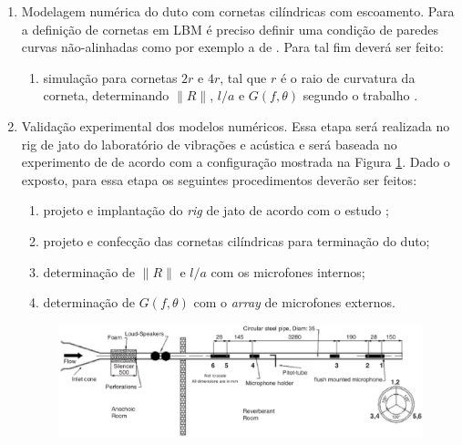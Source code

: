 \begin{enumerate}
    \item Modelagem numérica do duto com cornetas cilíndricas com escoamento. Para a definição de cornetas em LBM é preciso definir uma condição de paredes curvas não-alinhadas como por exemplo a de . Para tal fim deverá ser feito:
        \begin{enumerate}
            \item simulação para cornetas $2r$ e $4r$, tal que $r$ é o raio de curvatura da corneta, determinando $\|R\|$, $l/a$ e $G(f,\theta)$ segundo o trabalho \cite{da2009sound}.
        \end{enumerate}
    
    \item Validação experimental dos modelos numéricos. Essa etapa será realizada no rig de jato do laboratório de vibrações e acústica e será baseada no experimento de  de acordo com a configuração mostrada na Figura \ref{fig:duto_abom}. Dado o exposto, para essa etapa os seguintes procedimentos deverão ser feitos:
    \begin{enumerate}
            \item projeto e implantação do \textit{rig} de jato de acordo com o estudo \cite{allam2006investigation};
            \item projeto e confecção das cornetas cilíndricas para terminação do duto;
            \item determinação de $\|R\|$ e $l/a$ com os microfones internos; 
            \item determinação de $G(f,\theta)$ com o \textit{array} de microfones externos. 
        \end{enumerate}
    \begin{figure}[ht!]
    \centering
      \includegraphics[width=.95\linewidth]{figuras/duto_abom.eps}
      \\
      \label{fig:duto_abom}
    \end{figure}
    

\end{enumerate}
